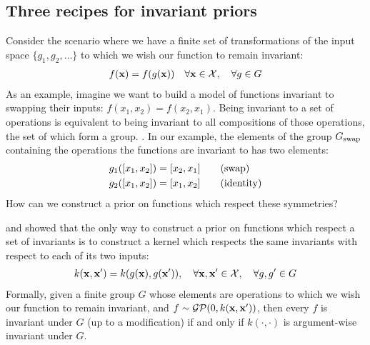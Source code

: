 \subsection{Three recipes for invariant priors}

Consider the scenario where we have a finite set of transformations of the input space $\{g_1, g_2, \ldots \}$ to which we wish our function to remain invariant:
%
\begin{align}
f({\bf{x}}) = f(g({\bf{x}}))  \quad \forall {\bf{x}} \in \mathcal{X}, \quad \forall g \in G
\end{align}
%
As an example, imagine we want to build a model of functions invariant to swapping their inputs: $f(x_1, x_2) = f(x_2, x_1)$.
Being invariant to a set of operations is equivalent to being invariant to all compositions of those operations, the set of which form a group. \citep[chapter 21]{armstrong1988groups}.
In our example, the elements of the group $G_\textnormal{swap}$ containing the operations the functions are invariant to has two elements:%
%
\begin{align}
g_1([x_1, x_2]) & = [x_2, x_1] \qquad \textnormal{(swap)} \\
g_2([x_1, x_2]) & = [x_1, x_2] \qquad \textnormal{(identity)}
\end{align}
%
How can we construct a prior on functions which respect these symmetries?

\citet{ginsbourger2012argumentwise} and \citet{Invariances13} showed that the only way to construct a \gp{} prior on functions which respect a set of invariants is to construct a kernel which respects the same invariants with respect to each of its two inputs:
%
\begin{align}
k({\bf{x}}, {\bf{x}}') = k( g({\bf{x}}), g({\bf{x}}')), \quad \forall {\bf{x}}, {\bf{x}}' \in \mathcal{X}, \quad \forall g, g' \in G
\end{align}
%
Formally, given a finite group $G$ whose elements are operations to which we wish our function to remain invariant, and $f \sim \mathcal{GP}\!\left(0,k({\bf{x}},{\bf{x}}')\right)$, then every $f$ is invariant under $G$ (up to a modification) if and only if $k(\cdot, \cdot)$ is argument-wise invariant under $G$.

